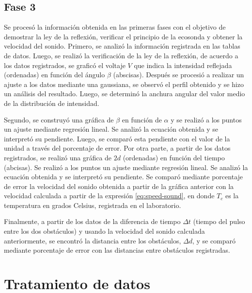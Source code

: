 \documentclass[spanish,notitlepage,letterpaper, 12pt]{article}
\begin{document}
\subsection{Fase 3}
Se procesó la información obtenida en las primeras fases con el objetivo de
demostrar la ley de la reflexión, verificar el principio de la ecosonda y obtener la velocidad
del sonido. Primero, se analizó la información registrada en las tablas de datos. Luego,
se realizó la verificación de la ley de la reflexión, de acuerdo a los datos registrados, se graficó el voltaje $V$ que indica la intensidad reflejada (ordenadas) en función
del ángulo $\beta$ (abscisas). Después se procesió a realizar un ajuste a los datos mediante
una gaussiana, se observó el perfil obtenido y se hizo un análisis del resultado. Luego,
se determinó la anchura angular del valor medio de la distribución de intensidad.\par
\bigskip
Segundo, se construyó una gráfica de $\beta$ en función de $\alpha$ y se
realizó a los puntos un ajuste mediante regresión lineal. Se analizó la ecuación obtenida
y se interpretó su pendiente. Luego, se comparó esta pendiente con el valor de la unidad
a través del porcentaje de error.
Por otra parte, a partir de los datos registrados, se realizó una gráfica de $2d$
(ordenadas) en función del tiempo (abcisas). Se realizó a los puntos un ajuste mediante
regresión lineal. Se analizó la ecuación obtenida y se interpretó su pendiente. Se
comparó mediante porcentaje de error la velocidad del sonido obtenida a partir de la
gráfica anterior con la velocidad calculada a partir de la expresión \eqref{eq:speed-sound}, en
donde $T_c$ es la temperatura en grados Celsius, registrada en el laboratorio.\par
\bigskip
Finalmente, a partir de los datos de la diferencia de tiempo $\Delta t$ (tiempo del pulso entre los
dos obstáculos) y usando la velocidad del sonido calculada anteriormente, se encontró la
distancia entre los obstáculos, $\Delta d$, y se comparó mediante porcentaje de error con las
distancias entre obstáculos registradas.
\section{Tratamiento de datos} \label{TD}
\end{document}
